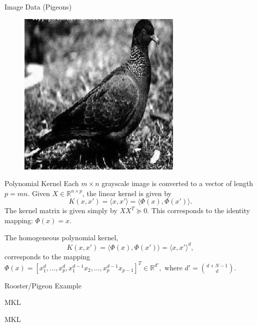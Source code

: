 \documentclass{beamer}
\begin{document}
\begin{frame}{Image Data (Pigeons)}
\begin{figure}
    \includegraphics[scale=.35]{pigeonrs-image_0004.jpg}
  \end{figure}
\end{frame}

\begin{frame}{Polynomial Kernel}
  Each $m \times n$ grayscale image is converted to a vector of
  length $p=mn$.  \pause
  Given $X \in \mathbb{R}^{n \times p}$, the linear kernel is given by
  $$
  K(x, x') = \langle x, x'\rangle = \langle \Phi(x), \Phi(x')\rangle.
  $$
  The kernel matrix is given simply by $XX^T  \succeq 0$.  This
  corresponds to the identity mapping: $\Phi(x) = x$. \pause

  The homogeneous polynomial kernel,
  $$
  K(x, x') = \langle \Phi(x), \Phi(x')\rangle = \langle x, x' \rangle^d,
  $$
  corresponds to the mapping $\Phi(x) = [x_1^d, \ldots, x_p^d,
  x_1^{d-1}x_2, \ldots, x_p^{d-1}x_{p-1}]^T \in \mathbb{R}^{d'},
  \text{ where } d'=\binom{d+N-1}{d}$.
\end{frame}

\begin{frame}{Rooster/Pigeon Example}
  \begin{center}
    \resizebox{10.0cm}{!}{
      
    }
  \end{center}
\end{frame}

\begin{frame}{MKL}
  \begin{center}
    \resizebox{10.0cm}{!}{
      
    }
  \end{center}
\end{frame}

\begin{frame}{MKL}
  \begin{center}
    \resizebox{10.0cm}{!}{
      
    }
  \end{center}
\end{frame}
\end{document}

